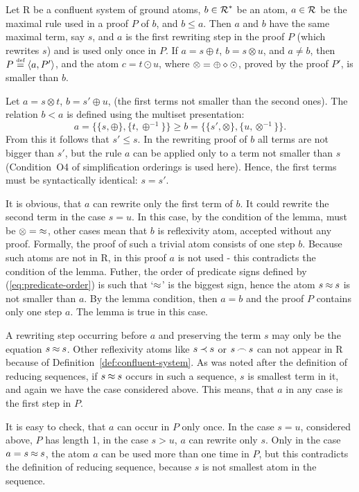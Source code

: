 \begin{LEMMA} \label {le:first-rule}
Let \C R be a confluent system of ground atoms, \(b\in\mbox{$\cal R$}^\ast\) be an atom,
\(a\in\mbox{$\cal R$}\) be the maximal rule used in a proof $P$ of $b$, and \(b\leq a\).
Then $a$ and $b$ have the same maximal term, say $s$, and $a$ is the first
rewriting step in the proof $P$ (which rewrites $s$) and is used only once in
$P$. If \(a = s\oplus t\), \(b = s\otimes u\), and \(a\ne b\), then \(P\mathrel{\stackrel{\mbox{\tiny def}}{=}}
\langle a,P'\rangle\), and the atom \(c = t\odot u\), where \(\otimes = \oplus\diamond\odot\), proved by the proof $P'$, is smaller than $b$.
\end{LEMMA}
\begin{PROOF}
Let $a=s\otimes t$, $b=s'\oplus u$, (the first terms not smaller than the
second ones). The relation \(b<a\) is defined using the multiset presentation:
\[a=\{\{s,\oplus\},\{t,\oplus^{-1}\}\} \geq 
 b=\{\{s',\otimes\},\{u,\otimes^{-1}\}\}.\] 
From this it follows that $s'\leq s$. 
In the rewriting proof of $b$ all terms are not
bigger than $s'$, but the rule $a$ can be applied only to a term not smaller
than $s$ (Condition~O4 of simplification orderings is used here). Hence, the
first terms must be syntactically identical: $s=s'$.

It is obvious, that $a$ can rewrite only the first term of $b$. It could
rewrite the second term in the case \(s=u\). In this case, by the condition of
the lemma, must be \(\otimes=\mathbin{\approx}\), other cases mean that $b$ is reflexivity
atom, accepted without any proof. Formally, the proof of such a trivial atom
consists of one step $b$. Because such atoms are not in \C R, in this proof
$a$ is not used - this contradicts the condition of the lemma. Futher, the order of
predicate signs defined by (\ref {eq:predicate-order}) is such that `$\mathbin{\approx}$' is
the biggest sign, hence the atom $s\mathbin{\approx} s$ is not smaller than $a$. By the
lemma condition, then \(a=b\) and the proof $P$ contains only one step $a$.
The lemma is true in this case.

A rewriting step occurring before $a$ and preserving the term $s$ may only be
the equation \(s\mathbin{\approx} s\). Other reflexivity atoms like $s\mathbin{\prec} s$ or $s\mathbin{\frown} s$
can not appear in \C R because of Definition~\ref {def:confluent-system}. As
was noted after the definition of reducing sequences, if \(s\mathbin{\approx} s\) occurs in
such a sequence, $s$ is smallest term in it, and again we have the case
considered above. This means, that $a$ in any case is the first step in $P$.

It is easy to check, that $a$ can occur in $P$ only once. In the case \(s=u\),
considered above, $P$ has length 1, in the case \(s>u\), $a$ can rewrite only
$s$. Only in the case \(a=s\mathbin{\approx} s\), the atom $a$ can be used more than one
time in $P$, but this contradicts the definition of reducing sequence, because
$s$ is not smallest atom in the sequence.


\end{PROOF}
